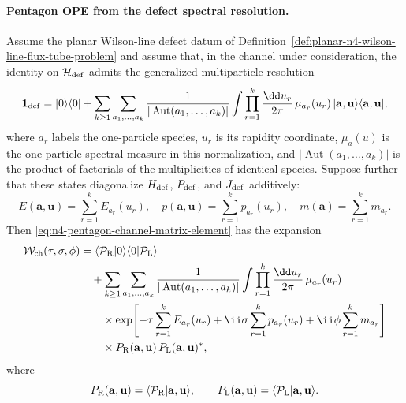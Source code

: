 \paragraph{Pentagon OPE from the defect spectral resolution.}
Assume the planar Wilson-line defect datum of
Definition~\ref{def:planar-n4-wilson-line-flux-tube-problem} and assume that,
in the channel under consideration, the identity on \(\mathcal H_{\rm def}\)
admits the generalized multiparticle resolution
\begin{equation}
  \mathbf 1_{\rm def}
  =
  |0\rangle\langle0|
  +
  \sum_{k\geq1}
  \sum_{a_1,\ldots,a_k}
  \frac{1}{|\operatorname{Aut}(a_1,\ldots,a_k)|}
  \int
  \prod_{r=1}^k
  \frac{\dd u_r}{2\pi}\,\mu_{a_r}(u_r)\,
  |\mathbf a,\mathbf u\rangle\langle\mathbf a,\mathbf u| ,
  \label{eq:n4-flux-tube-identity-resolution}
\end{equation}
where \(a_r\) labels the one-particle species, \(u_r\) is its rapidity
coordinate, \(\mu_a(u)\) is the one-particle spectral measure in this
normalization, and
\(|\operatorname{Aut}(a_1,\ldots,a_k)|\) is the product of factorials of the
multiplicities of identical species.  Suppose further that these states
diagonalize \(H_{\rm def}\), \(P_{\rm def}\), and \(J_{\rm def}\) additively:
\[
  E(\mathbf a,\mathbf u)=\sum_{r=1}^kE_{a_r}(u_r),\quad
  p(\mathbf a,\mathbf u)=\sum_{r=1}^kp_{a_r}(u_r),\quad
  m(\mathbf a)=\sum_{r=1}^km_{a_r}.
\]
Then \eqref{eq:n4-pentagon-channel-matrix-element} has the expansion
\begin{align}
  \mathcal W_{\rm ch}(\tau,\sigma,\phi)
  &=
  \langle\mathcal P_{\rm R}|0\rangle
  \langle0|\mathcal P_{\rm L}\rangle
  \notag\\
  &\quad+
  \sum_{k\geq1}
  \sum_{a_1,\ldots,a_k}
  \frac{1}{|\operatorname{Aut}(a_1,\ldots,a_k)|}
  \int
  \prod_{r=1}^k
  \frac{\dd u_r}{2\pi}\,\mu_{a_r}(u_r)\,
  \notag\\
  &\qquad\times
  \exp\!\left[
    -\tau\sum_{r=1}^kE_{a_r}(u_r)
    +\ii\sigma\sum_{r=1}^kp_{a_r}(u_r)
    +\ii\phi\sum_{r=1}^km_{a_r}
  \right]
  \notag\\
  &\qquad\times
  P_{\rm R}(\mathbf a,\mathbf u)\,
  P_{\rm L}(\mathbf a,\mathbf u)^* ,
  \label{eq:n4-pentagon-ope-spectral-form}
\end{align}
where
\[
  P_{\rm R}(\mathbf a,\mathbf u)
  =
  \langle\mathcal P_{\rm R}|\mathbf a,\mathbf u\rangle,
  \qquad
  P_{\rm L}(\mathbf a,\mathbf u)
  =
  \langle\mathcal P_{\rm L}|\mathbf a,\mathbf u\rangle .
\]

